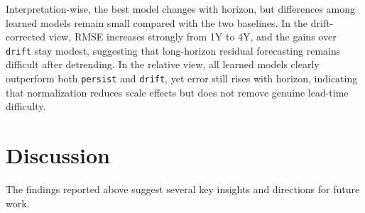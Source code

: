 \documentclass{article}
\begin{document}
\begin{table}[htbp]
\centering
\caption{Horizon comparison (RMSE) across two target views: drift-corrected residuals (\texttt{TARGET\_MODE=drift\_residual}) and smoothed relative levels (\texttt{TARGET\_MODE=smooth\_relative}). Models were retrained for each horizon (\(1\)Y to \(4\)Y). Best score in each column is in bold.}
\label{tab:horizon_combined}
\end{table}

Interpretation-wise, the best model changes with horizon, but differences among learned models remain small compared with the two baselines. In the drift-corrected view, RMSE increases strongly from 1Y to 4Y, and the gains over \texttt{drift} stay modest, suggesting that long-horizon residual forecasting remains difficult after detrending. In the relative view, all learned models clearly outperform both \texttt{persist} and \texttt{drift}, yet error still rises with horizon, indicating that normalization reduces scale effects but does not remove genuine lead-time difficulty.

\newpage
\section{Discussion}
The findings reported above suggest several key insights and directions for future work.
\end{document}
